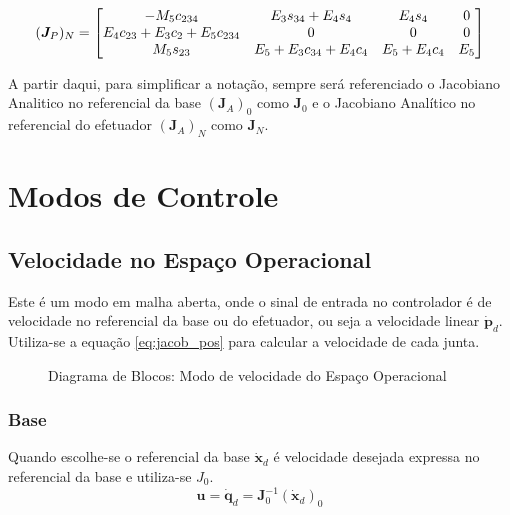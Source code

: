 \begin{equation}
(\bm{J}_P)_N =  
\begin{bmatrix}
    -M_5c_{234} & E_3s_{34}+E_4s_4 & E_4s_4 & 0 \\
    E_4c_{23}+E_3c_2+E_5c_{234} & 0 & 0 & 0 \\
    M_5s_{23} &  E_5+E_3c_{34}+E_4c_4 & E_5+E_4c_4 & E_5 
\end{bmatrix}
\end{equation}

A partir daqui, para simplificar a notação, sempre será referenciado o Jacobiano Analitico no referencial da base $(\bm{J}_A)_0$  como  $\bm{J}_0$ e o Jacobiano Analítico no referencial do efetuador $(\bm{J}_A)_N$ como $\bm{J}_N$.


\section{Modos de Controle}
\subsection{Velocidade no Espaço Operacional}
Este é um modo em malha aberta, onde o sinal de entrada no controlador é de velocidade no referencial da base ou do efetuador, ou seja a velocidade linear $\bm{\dot{p}}_d$. Utiliza-se a equação \eqref{eq:jacob_pos} para calcular a velocidade de cada junta. 

\begin{figure}[h!]
\centering
{}
\caption{Diagrama de Blocos: Modo de velocidade do Espaço Operacional}
\label{fig:vel_op}
\end{figure}


\subsubsection{Base}
Quando escolhe-se o referencial da base $\bm{\dot{x}}_d$ é velocidade desejada expressa no referencial da base e utiliza-se $J_0$.
\begin{equation}
\bm{u} = \bm{\dot{q}}_d = \bm{J}_0^{-1} (\bm{\dot{x}}_d)_0
\end{equation}
